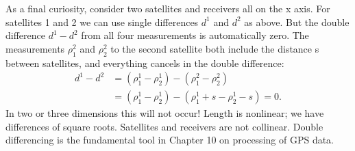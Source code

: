 As a final curiosity, consider two satellites and receivers all on the x axis. For satellites 1 and 2 we can use single differences $d^1$ and $d^2$ as above. But the double difference
$d^1-d^2$ from all four measurements is automatically zero. The measurements $\rho^2_1$ and $\rho^2_2$ to the second satellite both include the distance s between satellites, and everything cancels in the double difference:
\begin{equation*}
\begin{split}
d^1-d^2&=(\rho^1_1-\rho^1_2)-(\rho^2_1-\rho^2_2)\\
&=(\rho^1_1-\rho^1_2)-(\rho^1_1+s-\rho^1_2-s)=0.
\end{split}
\end{equation*}
In two or three dimensions this will not occur! Length is nonlinear; we have differences of
square roots. Satellites and receivers are not collinear. Double differencing is the fundamental tool in Chapter 10 on processing of GPS data.

